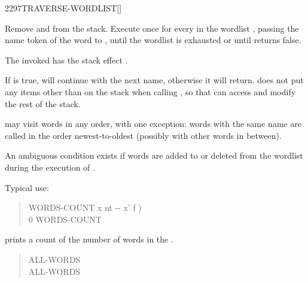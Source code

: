 \begin{worddef}{2297}{TRAVERSE-WORDLIST}[]%
\item {}

	Remove  and  from the stack.  Execute
	 once for every
	 in the
	wordlist ,
	passing the name token  of the word to ,
	until the wordlist is exhausted or until  returns false.

	The invoked  has the stack effect
	.

	If  is true,  will continue
	with the next name, otherwise it will return.  
	does not put any items other than  on the stack when
	calling , so that  can access and modify the
	rest of the stack.


	 may visit words in any order, with one
	exception: words with the same name are called in the order
	newest-to-oldest (possibly with other words in between).

	An ambiguous condition exists if words are added to or deleted from
	the wordlist  during the execution of
	.


	\begin{rationale}
		Typical use:

		\begin{quote}\ttfamily
 			\word{:} WORDS-COUNT  x nt -{}- x' f )
				  
			\word{;}
		\\
			0  WORDS-COUNT
			 
		\end{quote}

		prints a count of the number of words in the .

		\begin{quote}\ttfamily
			\word{:} ALL-WORDS
				   
			\word{;}
		\\
			 ALL-WORDS 
		\end{quote}
 

\end{rationale}
\end{worddef}

